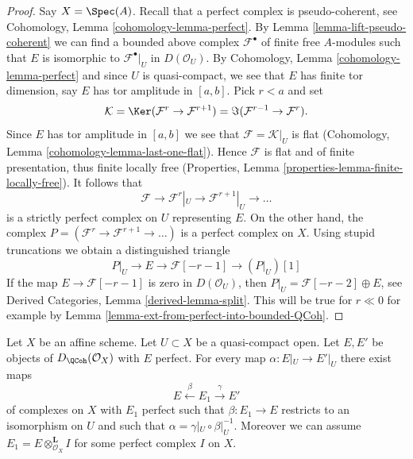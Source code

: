 \begin{proof}
Say $X = \Spec(A)$. Recall that a perfect complex is
pseudo-coherent, see
Cohomology, Lemma \ref{cohomology-lemma-perfect}.
By Lemma \ref{lemma-lift-pseudo-coherent} we can find a bounded above complex
$\mathcal{F}^\bullet$ of finite free $A$-modules such that $E$ is
isomorphic to $\mathcal{F}^\bullet|_U$ in $D(\mathcal{O}_U)$.
By Cohomology, Lemma \ref{cohomology-lemma-perfect} and since
$U$ is quasi-compact, we see that $E$ has finite tor dimension, say
$E$ has tor amplitude in $[a, b]$. Pick $r < a$ and set
$$
\mathcal{K} = \Ker(\mathcal{F}^{r} \to \mathcal{F}^{r + 1})
= \Im(\mathcal{F}^{r - 1} \to \mathcal{F}^r).
$$
Since $E$ has tor amplitude in $[a, b]$ we see that
$\mathcal{F} = \mathcal{K}|_U$ is
flat (Cohomology, Lemma \ref{cohomology-lemma-last-one-flat}).
Hence $\mathcal{F}$ is flat and of finite presentation, thus finite
locally free (Properties, Lemma \ref{properties-lemma-finite-locally-free}).
It follows that
$$
\mathcal{F} \to \mathcal{F}^r|_U \to \mathcal{F}^{r + 1}|_U \to \ldots
$$
is a strictly perfect complex on $U$ representing $E$. On the other hand,
the complex $P = (\mathcal{F}^r \to \mathcal{F}^{r + 1} \to \ldots )$
is a perfect complex on $X$. Using
stupid truncations we obtain a distinguished triangle
$$
P|_U \to E \to \mathcal{F}[-r - 1] \to (P|_U)[1]
$$
If the map $E \to \mathcal{F}[-r - 1]$ is zero in $D(\mathcal{O}_U)$,
then $P|_U = \mathcal{F}[-r - 2] \oplus E$, see
Derived Categories, Lemma \ref{derived-lemma-split}.
This will be true for $r \ll 0$ for example by
Lemma \ref{lemma-ext-from-perfect-into-bounded-QCoh}.
\end{proof}

\begin{lemma}
\label{lemma-lift-map}
Let $X$ be an affine scheme. Let $U \subset X$ be a quasi-compact open.
Let $E, E'$ be objects of $D_\QCoh(\mathcal{O}_X)$ with $E$ perfect.
For every map $\alpha : E|_U \to E'|_U$ there exist maps
$$
E \xleftarrow{\beta} E_1 \xrightarrow{\gamma} E'
$$
of complexes on $X$ with $E_1$ perfect such that $\beta : E_1 \to E$
restricts to an isomorphism on $U$ and such that
$\alpha = \gamma|_U \circ \beta|_U^{-1}$.
Moreover we can assume $E_1 = E \otimes_{\mathcal{O}_X}^\mathbf{L} I$
for some perfect complex $I$ on $X$.
\end{lemma}

